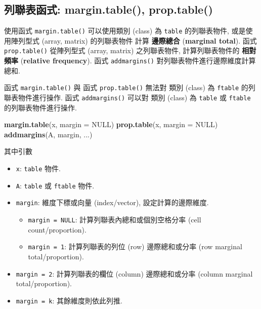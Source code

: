 \documentclass[
]{book}
\newenvironment{Shaded}{\begin{snugshade}}{\end{snugshade}}
\newcommand{\DataTypeTok}[1]{\textcolor[rgb]{0.13,0.29,0.53}{#1}}
\newcommand{\KeywordTok}[1]{\textcolor[rgb]{0.13,0.29,0.53}{\textbf{#1}}}
\newcommand{\NormalTok}[1]{#1}
\newcommand{\OtherTok}[1]{\textcolor[rgb]{0.56,0.35,0.01}{#1}}
\providecommand{\tightlist}{%
  \setlength{\itemsep}{0pt}\setlength{\parskip}{0pt}}
\begin{document}
\hypertarget{ux5217ux806fux8868ux51fdux5f0f-margin.table-prop.table}{%
\subsection{列聯表函式: margin.table(), prop.table()}\label{ux5217ux806fux8868ux51fdux5f0f-margin.table-prop.table}}

使用函式
\texttt{margin.table()}
可以使用類別 (class) 為 \texttt{table} 的列聯表物件,
或是使用陣列型式 (array, matrix) 的列聯表物件
計算
\textbf{邊際總合}
(\textbf{marginal total}).
函式
\texttt{prop.table()}
從陣列型式 (array, matrix) 之列聯表物件,
計算列聯表物件的
\textbf{相對頻率}
(\textbf{relative frequency}).
函式
\texttt{addmargins()}
對列聯表物件進行邊際維度計算總和.

函式
\texttt{margin.table()}
與
函式
\texttt{prop.table()}
無法對
類別 (class) 為 \texttt{ftable} 的列聯表物件進行操作.
函式
\texttt{addmargins()}
可以對
類別 (class) 為 \texttt{table} 或 \texttt{ftable} 的列聯表物件進行操作.

\begin{Shaded}
\begin{Highlighting}[]
\KeywordTok{margin.table}\NormalTok{(x, }\DataTypeTok{margin =} \OtherTok{NULL}\NormalTok{)}
\KeywordTok{prop.table}\NormalTok{(x, }\DataTypeTok{margin =} \OtherTok{NULL}\NormalTok{)}
\KeywordTok{addmargins}\NormalTok{(A, margin, ...)}
\end{Highlighting}
\end{Shaded}

其中引數

\begin{itemize}
\tightlist
\item
  \texttt{x}: \texttt{table} 物件.
\item
  \texttt{A}: \texttt{table} 或 \texttt{ftable} 物件.
\item
  \texttt{margin}: 維度下標或向量 (index/vector), 設定計算的邊際維度.

  \begin{itemize}
  \tightlist
  \item
    \texttt{margin\ =\ NULL}: 計算列聯表內總和或個別空格分率 (cell count/proportion).
  \item
    \texttt{margin\ =\ 1}: 計算列聯表的列位 (row) 邊際總和或分率 (row marginal total/proportion).
  \end{itemize}
\item
  \texttt{margin\ =\ 2}: 計算列聯表的欄位 (column) 邊際總和或分率 (column marginal total/proportion).
\item
  \texttt{margin\ =\ k}: 其餘維度則依此列推.
\end{itemize}
\end{document}
